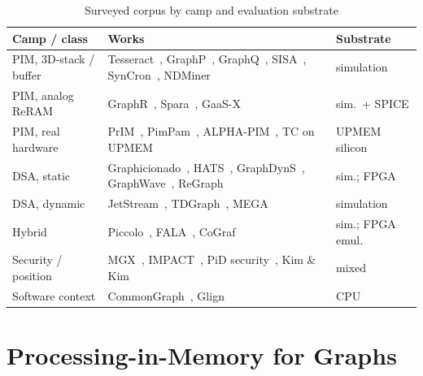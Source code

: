 \documentclass[journal,onecolumn]{IEEEtran}
\begin{document}
\begin{table}[t]
\caption{Surveyed corpus by camp and evaluation substrate}
\label{tab:corpus}
\centering\scriptsize
\begin{tabularx}{\columnwidth}{@{}L{1.55cm}YL{1.15cm}@{}}
\toprule
Camp / class & Works & Substrate \\
\midrule
PIM, 3D-stack / buffer & Tesseract~\cite{ahn2015tesseract}, GraphP~\cite{zhang2018graphp}, GraphQ~\cite{zhuo2019graphq}, SISA~\cite{besta2021sisa}, SynCron~\cite{giannoula2021syncron}, NDMiner~\cite{talati2022ndminer} & simulation \\
PIM, analog ReRAM & GraphR~\cite{song2018graphr}, Spara~\cite{zheng2020spara}, GaaS-X~\cite{challapalle2020gaasx} & sim.\ + SPICE \\
PIM, real hardware & PrIM~\cite{gomezluna2022prim}, PimPam~\cite{cai2024pimpam}, ALPHA-PIM~\cite{barkhordar2025alphapim}, TC on UPMEM~\cite{asquini2025tc} & UPMEM silicon \\
DSA, static & Graphicionado~\cite{ham2016graphicionado}, HATS~\cite{mukkara2018hats}, GraphDynS~\cite{yan2019graphdyns}, GraphWave~\cite{lee2022graphwave}, ReGraph~\cite{chen2022regraph} & sim.; FPGA \\
DSA, dynamic & JetStream~\cite{rahman2021jetstream}, TDGraph~\cite{zhao2022tdgraph}, MEGA~\cite{gao2023mega} & simulation \\
Hybrid & Piccolo~\cite{shin2025piccolo}, FALA~\cite{shin2025fala}, CoGraf~\cite{yenimol2026cograf} & sim.; FPGA emul. \\
Security / position & MGX~\cite{hua2022mgx}, IMPACT~\cite{bostanci2025impact}, PiD security~\cite{yuksel2026pid}, Kim \& Kim~\cite{kim2020dynamic} & mixed \\
Software context & CommonGraph~\cite{afarin2023commongraph}, Glign~\cite{yin2023glign} & CPU \\
\bottomrule
\end{tabularx}
\end{table}

\section{Processing-in-Memory for Graphs}\label{sec:pim}
\end{document}
